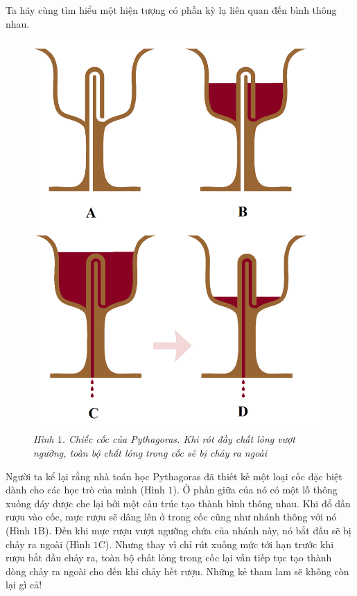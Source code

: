 \begin{multicols}{2}
	Ta hãy cùng tìm hiểu một hiện tượng có phần kỳ lạ liên quan đến bình thông nhau.
	\begin{figure}[H]
		\vspace*{-5pt}
		\centering
		\captionsetup{labelformat= empty, justification=centering}
		\includegraphics[width= 1\linewidth]{1}
		\caption{\small\textit{\color{quantoan}Hình $1$. Chiếc cốc của Pythagoras. Khi rót đầy chất lỏng vượt ngưỡng, toàn bộ chất lỏng trong cốc sẽ bị chảy ra ngoài}}
		\vspace*{-10pt}
	\end{figure}
	Người ta kể lại rằng nhà toán học Pythagoras đã thiết kế một loại cốc đặc biệt dành cho các học trò của mình (Hình $1$). Ở phần giữa của nó có một lỗ thông xuống đáy được che lại bởi một cấu trúc tạo thành bình thông nhau. Khi đổ dần rượu vào cốc, mực rượu sẽ dâng lên ở trong cốc cũng như nhánh thông với nó (Hình $1$B). Đến khi mực rượu vượt ngưỡng chứa của nhánh này, nó bắt đầu sẽ bị chảy ra ngoài (Hình $1$C). Nhưng thay vì chỉ rút xuống mức tới hạn trước khi rượu bắt đầu chảy ra, toàn bộ chất lỏng trong cốc lại vẫn tiếp tục tạo thành dòng chảy ra ngoài cho đến khi chảy hết rượu. Những kẻ tham lam sẽ không còn lại gì cả!

\end{multicols}
